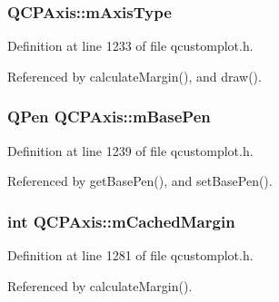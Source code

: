 \hypertarget{class_q_c_p_axis_ae704bf9f2c2b026f08dd4ccad79c616e}{}
\subsubsection[{m\+Axis\+Type}]{ Q\+C\+P\+Axis\+::m\+Axis\+Type\hspace{0.3cm}{\ttfamily [protected]}}\label{class_q_c_p_axis_ae704bf9f2c2b026f08dd4ccad79c616e}


Definition at line 1233 of file qcustomplot.\+h.



Referenced by calculate\+Margin(), and draw().

\hypertarget{class_q_c_p_axis_ad6b4a0aee9558fb35529e960b8fef72d}{}
\subsubsection[{m\+Base\+Pen}]{\setlength{\rightskip}{0pt plus 5cm}Q\+Pen Q\+C\+P\+Axis\+::m\+Base\+Pen\hspace{0.3cm}{\ttfamily [protected]}}\label{class_q_c_p_axis_ad6b4a0aee9558fb35529e960b8fef72d}


Definition at line 1239 of file qcustomplot.\+h.



Referenced by get\+Base\+Pen(), and set\+Base\+Pen().

\hypertarget{class_q_c_p_axis_a48ace55cbd54f7241e7f1b06fd369b64}{}
\subsubsection[{m\+Cached\+Margin}]{\setlength{\rightskip}{0pt plus 5cm}int Q\+C\+P\+Axis\+::m\+Cached\+Margin\hspace{0.3cm}{\ttfamily [protected]}}\label{class_q_c_p_axis_a48ace55cbd54f7241e7f1b06fd369b64}


Definition at line 1281 of file qcustomplot.\+h.



Referenced by calculate\+Margin().

